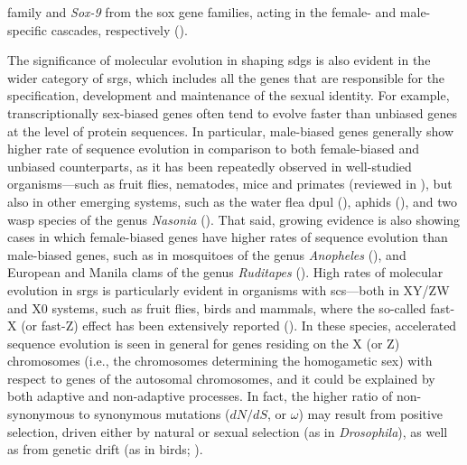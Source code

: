family and \textit{Sox-9} from the \gls{sox} gene families, acting in the female- and male-specific cascades, respectively ().

The significance of molecular evolution in shaping \glspl{sdg} is also evident in the wider category of \glspl{srg}, which includes all the genes that are responsible for the specification, development and maintenance of the sexual identity. For example, transcriptionally sex-biased genes often tend to evolve faster than unbiased genes at the level of protein sequences. In particular, male-biased genes generally show higher rate of sequence evolution in comparison to both female-biased and unbiased counterparts, as it has been repeatedly observed in well-studied organisms---such as fruit flies, nematodes, mice and primates (reviewed in ), but also in other emerging systems, such as the water flea \gls{dpul} (), aphids (), and two wasp species of the genus \textit{Nasonia} (). That said, growing evidence is also showing cases in which female-biased genes have higher rates of sequence evolution than male-biased genes, such as in mosquitoes of the genus \textit{Anopheles} (), and European and Manila clams of the genus \textit{Ruditapes} (). High rates of molecular evolution in \glspl{srg} is particularly evident in organisms with \glspl{sc}---both in XY/ZW and X0 systems, such as fruit flies, birds and mammals, where the so-called fast-X (or fast-Z) effect has been extensively reported (). In these species, accelerated sequence evolution is seen in general for genes residing on the X (or Z) chromosomes (i.e., the chromosomes determining the homogametic sex) with respect to genes of the autosomal chromosomes, and it could be explained by both adaptive and non-adaptive processes. In fact, the higher ratio of non-synonymous to synonymous mutations ($dN/dS$, or $\omega$) may result from positive selection, driven either by natural or sexual selection (as in \textit{Drosophila}), as well as from genetic drift (as in birds; ).

